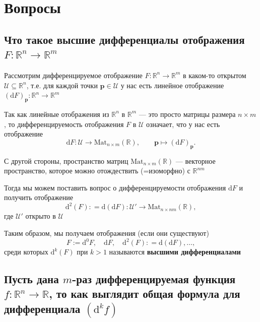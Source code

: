 \documentclass[a4paper]{article}
\newcommand{\m}[1]{\mathbf{#1}}
\begin{document}
\tableofcontents
\newpage
\section{Вопросы}
\subsection{Что такое высшие дифференциалы отображения $F:\mathbb{R}^{n}\to\mathbb{R}^{m}$}
Рассмотрим дифференцируемое отображение $F:\mathbb{R}^n \to \mathbb{R}^m$ в каком-то открытом $\mathscr{U} \subseteq \mathbb{R}^n$, 
т.е. для каждой точки $\mathbf{p} \in \mathscr{U}$ у нас есть линейное отображение $(\mathrm{d}F)_{\mathbf{p}}: \mathbb{R}^n\to \mathbb{R}^m$

Так как линейные отображения из $\mathbb{R}^n$ в $\mathbb{R}^m$ — это просто матрицы размера $n\times m$, то дифференцируемость отображения $F$ в $\mathscr{U}$ означает, что у нас есть отображение
$$
\mathrm{d}F: \mathscr{U} \to \mathrm{Mat}_{n\times m}(\mathbb{R}), \qquad \mathbf{p} \mapsto (\mathrm{d}F)_{\mathbf{p}}.
$$

С другой стороны, пространство матриц $\mathrm{Mat}_{n\times m}(\mathbb{R})$ — векторное пространство, которое можно отождествить (=изоморфно) с $\mathbb{R}^{nm}$

Тогда мы можем поставить вопрос о дифференцируемости отображения $\mathrm{d}F$ и получить отображение
$$
\mathrm{d}^2(F): = \mathrm{d}(\mathrm{d}F): \mathscr{U}' \to \mathrm{Mat}_{n \times nm}(\mathbb{R}),
$$
где $\mathscr{U}'$ открыто в $\mathscr{U}$

Таким образом, мы получаем отображения (если они существуют)
$$
F:=\mathrm{d}^0F,\quad  \mathrm{d}F,\quad \mathrm{d}^2(F): = \mathrm{d}(\mathrm{d}F), \ldots, 
$$
среди которых $\mathrm{d}^k(F)$ при $k>1$ называются \textbf{высшими дифференциалами}

\subsection{Пусть дана $m$-раз дифференцируемая функция $f:\mathbb{R}^{n}\to\mathbb{R}$, то как выглядит общая формула для дифференциала $(\mathrm{d}^kf)$}

\end{document}
